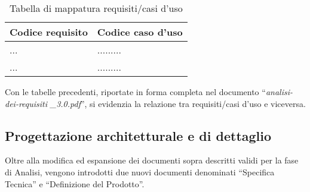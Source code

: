 \documentclass[a4paper,11pt]{article}
\begin{document}
\vspace{3 mm}
\begin{table}[h!]
\begin{tabularx}{\textwidth}{XX}
Codice requisito & Codice caso d'uso \\
\toprule
... & ......... \\
\midrule
... & ......... \\
\midrule
\end{tabularx}
\caption{Tabella di mappatura requisiti/casi d'uso}
\end{table}
\vspace{3 mm}
Con le tabelle precedenti, riportate in forma completa nel documento ``\textit{analisi-dei-requisiti}
\textit{\_3.0.pdf}'', si evidenzia la relazione tra requisiti/casi d'uso e viceversa.
\subsection{Progettazione architetturale e di dettaglio}
Oltre alla modifica ed espansione dei documenti sopra descritti validi per la fase di Analisi, vengono introdotti due nuovi documenti denominati ``Specifica Tecnica'' e ``Definizione del Prodotto''.
\end{document}
